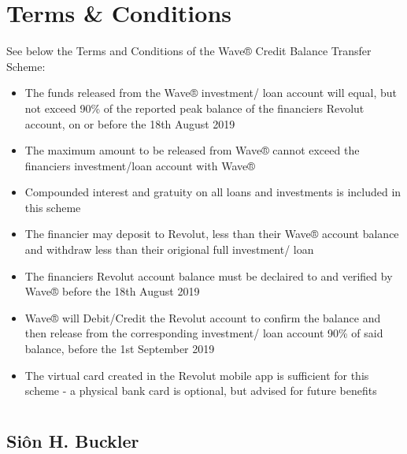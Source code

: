 \documentclass[letterpaper,10pt,openany,oneside,english]{sphinxmanual}
\begin{document}
\chapter{Terms \& Conditions}
\label{\detokenize{terms:terms-conditions}}\label{\detokenize{terms::doc}}
See below the Terms and Conditions of the Wave® Credit Balance Transfer Scheme:
\begin{itemize}
\item {} 
The funds released from the Wave® investment/ loan account will equal, but not exceed 90\% of the reported peak balance of the financiers Revolut account, on or before the 18th August 2019

\item {} 
The maximum amount to be released from Wave® cannot exceed the financiers investment/loan account with Wave®

\item {} 
Compounded interest and gratuity on all loans and investments is included in this scheme

\item {} 
The financier may deposit to Revolut, less than their Wave® account balance and withdraw less than their origional full investment/ loan

\item {} 
The financiers Revolut account balance must be declaired to and verified by Wave® before the 18th August 2019

\item {} 
Wave® will Debit/Credit the Revolut account to confirm the balance and then release from the corresponding investment/ loan account 90\% of said balance, before the 1st September 2019

\item {} 
The virtual card created in the Revolut mobile app is sufficient for this scheme - a physical bank card is optional, but advised for future benefits

\end{itemize}


\chapter{}
\label{\detokenize{index:document-author-s}}

\section{Siôn H. Buckler}
\label{\detokenize{index:sion-h-buckler}}
\end{document}
